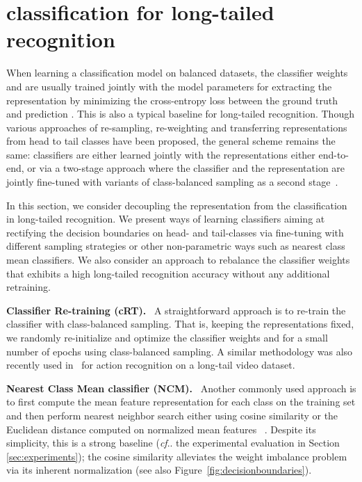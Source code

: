 \documentclass[dvipsnames]{article} \usepackage{iclr2020_conference, times}
\makeatletter
\DeclareRobustCommand\onedot{\futurelet\@let@token\@onedot}
\def\@onedot{\ifx\@let@token.\else.\null\fi\xspace}
\def\cf{\emph{cf}\onedot} \def\Cf{\emph{Cf}\onedot}
\newcommand{\header}[1]{\noindent\textbf{#1.}~}
\newcommand{\balanced}{class-balanced\xspace}
\newcommand{\ncm}{NCM\xspace}
\newcommand{\retrain}{cRT\xspace}
\makeatother
\begin{document}
\section{classification for long-tailed recognition}
\label{sec:classifiers}


When learning  a classification model on balanced datasets, the classifier weights  and   are usually trained jointly with   the model parameters  for extracting the representation  by minimizing the cross-entropy loss between the ground truth  and prediction . This is also a typical baseline for long-tailed recognition. Though various approaches of  re-sampling, re-weighting and transferring representations from head to tail classes  have been proposed, the general scheme remains the same: classifiers are either learned jointly with the representations either end-to-end, or via a two-stage approach where the classifier and the representation are jointly fine-tuned with variants of \balanced sampling as a second stage~\citep{cui2018large,cao2019learning}. 

In this section, we consider decoupling the representation from the classification in long-tailed recognition. We present ways of learning classifiers aiming at rectifying the decision boundaries on head- and tail-classes  via fine-tuning with different sampling strategies or other non-parametric ways such as nearest class mean classifiers. We also consider an approach to rebalance the classifier weights that exhibits a high long-tailed recognition accuracy without any additional retraining.

\header{Classifier Re-training (\retrain)}
A straightforward approach is to re-train the classifier with \balanced sampling. That is, keeping the representations fixed, we randomly re-initialize and optimize the classifier weights  and  for a small number of epochs using \balanced sampling. A similar methodology was also recently used in~\citep{zhang2019study} for action recognition on a long-tail video dataset.

\header{Nearest Class Mean classifier (\ncm)}
Another commonly used approach is to first compute the mean feature representation for each class on the training set and then perform nearest neighbor search either using cosine similarity or the Euclidean distance computed on  normalized mean features ~\citep{snell2017prototypical, guerriero2018deep, rebuffi2017icarl}. Despite its simplicity, this is a strong baseline (\cf the experimental evaluation in Section \ref{sec:experiments}); the cosine similarity alleviates the weight imbalance problem via its inherent normalization (see also Figure~\ref{fig:decisionboundaries}).
\end{document}
